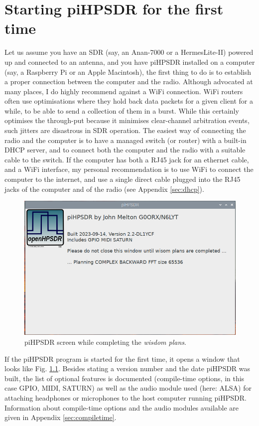 \documentclass[12pt]{book}
\def\pH{pi\-HPSDR\xspace}
\begin{document}
\chapter{Starting \pH for the first time}
Let us assume you have an SDR (say, an Anan-7000 or a HermesLite-II) powered up and connected to an antenna,
and you have \pH installed on a computer (say, a Raspberry Pi or an Apple Macintosh), the first thing to
do is to establish a proper connection between the computer and the radio. Although advocated at many
places,
I do highly recommend against a WiFi connection. WiFi routers often use optimisations where they hold
back data packets for a given client for a while, to be able to send a collection of them in a burst. While
this certainly optimises the through-put because it minimises clear-channel arbitration events, such jitters
are disastrous in SDR operation. The easiest way of connecting the radio and the computer is to have a
managed switch (or router) with a built-in DHCP server, and to connect both the computer and the radio with a suitable
cable to the switch. If the computer has both a RJ45 jack for an ethernet cable, and a WiFi interface, my
personal recommendation is to use WiFi to connect the computer to the internet, and use a single direct
cable plugged
into the RJ45 jacks of the computer and of the radio (see Appendix
\ref{sec:dhcp}).

\begin{figure}
\center
\includegraphics[width=12cm]{Planning.png}
\caption{\pH screen while completing the \textit{wisdom plans}.}
\label{fig:Planning}
\end{figure}

If the \pH program is started for the first time, it opens a window that looks like Fig. \ref{fig:Planning}.
Besides stating a version number and the date \pH was built, the list of optional features is
documented (compile-time options,
in this case  GPIO, MIDI, SATURN) as well as the audio module used (here: ALSA) for attaching headphones
or microphones to the host computer running \pH. Information about compile-time options and the
audio modules available are given in Appendix \ref{sec:compiletime}.
\end{document}
